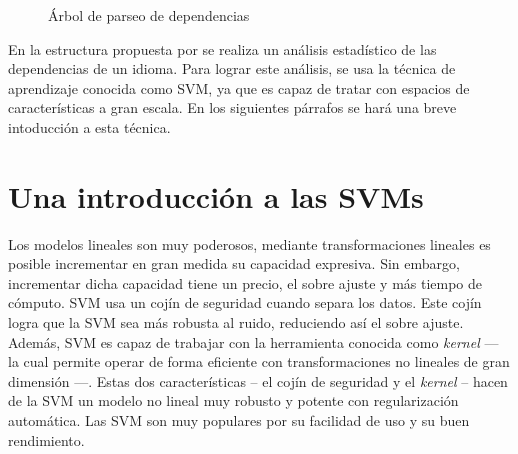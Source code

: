 \begin{figure}[th]
  \scriptsize
   \caption{Árbol de parseo de dependencias}
   \label{fig:deptree}
\end{figure}
En la estructura propuesta por \citeauthor{yamada2003} se realiza un análisis
estadístico de las dependencias de un idioma. Para lograr este análisis, se usa
la técnica de aprendizaje conocida como \ac{SVM}, ya que es capaz de tratar con
espacios de características a gran escala. En los siguientes párrafos se hará
una breve intoducción a esta técnica.

\section{Una introducción a las SVMs}
\label{sec:svmintro}

\nocite{yaser2012} Los modelos lineales son muy poderosos, mediante
transformaciones lineales es posible incrementar en gran medida su capacidad
expresiva. Sin embargo, incrementar dicha capacidad tiene un precio, el sobre
ajuste y más tiempo de cómputo. \ac{SVM} usa un cojín de seguridad cuando separa
los datos. Este cojín logra que la \ac{SVM} sea más robusta al ruido, reduciendo
así el sobre ajuste. Además, \ac{SVM} es capaz de trabajar con la herramienta
conocida como \emph{kernel} --- la cual permite operar de forma eficiente con
transformaciones no lineales de gran dimensión ---. Estas dos características --
el cojín de seguridad y el \emph{kernel} -- hacen de la \ac{SVM} un modelo no
lineal muy robusto y potente con regularización automática. Las \ac{SVM} son muy
populares por su facilidad de uso y su buen rendimiento.

